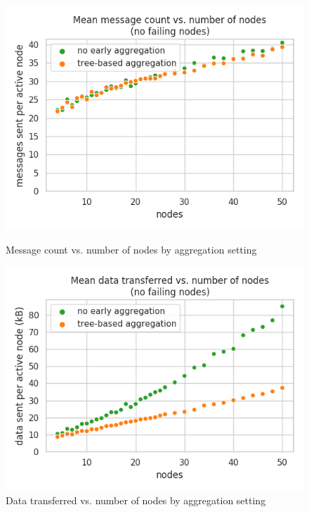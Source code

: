 \begin{figure}[H]
    \centering
    \begin{minipage}{0.5\textwidth}
        \centering
        \includegraphics[width=\textwidth]{figures/4/bandwidth_msg_tx_sum_by_mode.png}
        \captionsetup{labelformat=empty}
        \caption{Message count vs. number of nodes by aggregation setting}
    \end{minipage}\hfill
    \begin{minipage}{0.5\textwidth}
        \centering
        \includegraphics[width=\textwidth]{figures/4/bandwidth_tx_sum_by_mode.png}
        \captionsetup{labelformat=empty}
        \caption{Data transferred vs. number of nodes by aggregation setting}
    \end{minipage}\hfill
\end{figure}


